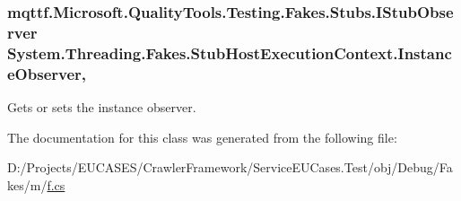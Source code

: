 \hypertarget{class_system_1_1_threading_1_1_fakes_1_1_stub_host_execution_context_a30cc3742424e64469263207f546cb127}{
\subsubsection[{Instance\-Observer}]{\setlength{\rightskip}{0pt plus 5cm}mqttf.\-Microsoft.\-Quality\-Tools.\-Testing.\-Fakes.\-Stubs.\-I\-Stub\-Observer System.\-Threading.\-Fakes.\-Stub\-Host\-Execution\-Context.\-Instance\-Observer\hspace{0.3cm}{\ttfamily [get]}, {\ttfamily [set]}}}\label{class_system_1_1_threading_1_1_fakes_1_1_stub_host_execution_context_a30cc3742424e64469263207f546cb127}


Gets or sets the instance observer.



The documentation for this class was generated from the following file\-:\begin{DoxyCompactItemize}
\item 
D\-:/\-Projects/\-E\-U\-C\-A\-S\-E\-S/\-Crawler\-Framework/\-Service\-E\-U\-Cases.\-Test/obj/\-Debug/\-Fakes/m/\hyperlink{m_2f_8cs}{f.\-cs}\end{DoxyCompactItemize}
